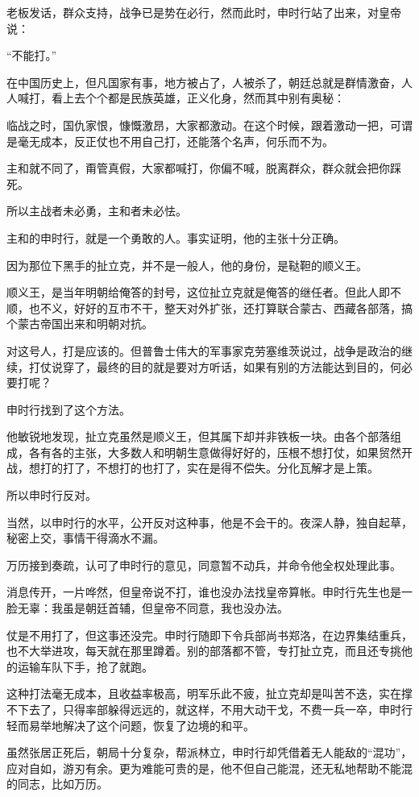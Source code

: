 \begin{multicols}{\theparacolNo}
老板发话，群众支持，战争已是势在必行，然而此时，申时行站了出来，对皇帝说：

“不能打。”

在中国历史上，但凡国家有事，地方被占了，人被杀了，朝廷总就是群情激奋，人人喊打，看上去个个都是民族英雄，正义化身，然而其中别有奥秘：

临战之时，国仇家恨，慷慨激昂，大家都激动。在这个时候，跟着激动一把，可谓是毫无成本，反正仗也不用自己打，还能落个名声，何乐而不为。

主和就不同了，甭管真假，大家都喊打，你偏不喊，脱离群众，群众就会把你踩死。

所以主战者未必勇，主和者未必怯。

主和的申时行，就是一个勇敢的人。事实证明，他的主张十分正确。

因为那位下黑手的扯立克，并不是一般人，他的身份，是鞑靼的顺义王。

顺义王，是当年明朝给俺答的封号，这位扯立克就是俺答的继任者。但此人即不顺，也不义，好好的互市不干，整天对外扩张，还打算联合蒙古、西藏各部落，搞个蒙古帝国出来和明朝对抗。

对这号人，打是应该的。但普鲁士伟大的军事家克劳塞维茨说过，战争是政治的继续，打仗说穿了，最终的目的就是要对方听话，如果有别的方法能达到目的，何必要打呢？

申时行找到了这个方法。

他敏锐地发现，扯立克虽然是顺义王，但其属下却并非铁板一块。由各个部落组成，各有各的主张，大多数人和明朝生意做得好好的，压根不想打仗，如果贸然开战，想打的打了，不想打的也打了，实在是得不偿失。分化瓦解才是上策。

所以申时行反对。

当然，以申时行的水平，公开反对这种事，他是不会干的。夜深人静，独自起草，秘密上交，事情干得滴水不漏。

万历接到奏疏，认可了申时行的意见，同意暂不动兵，并命令他全权处理此事。

消息传开，一片哗然，但皇帝说不打，谁也没办法找皇帝算帐。申时行先生也是一脸无辜：我虽是朝廷首辅，但皇帝不同意，我也没办法。

仗是不用打了，但这事还没完。申时行随即下令兵部尚书郑洛，在边界集结重兵，也不大举进攻，每天就在那里蹲着。别的部落都不管，专打扯立克，而且还专挑他的运输车队下手，抢了就跑。

这种打法毫无成本，且收益率极高，明军乐此不疲，扯立克却是叫苦不迭，实在撑不下去了，只得率部躲得远远的，就这样，不用大动干戈，不费一兵一卒，申时行轻而易举地解决了这个问题，恢复了边境的和平。

虽然张居正死后，朝局十分复杂，帮派林立，申时行却凭借着无人能敌的“混功”，应对自如，游刃有余。更为难能可贵的是，他不但自己能混，还无私地帮助不能混的同志，比如万历。


\end{multicols}
